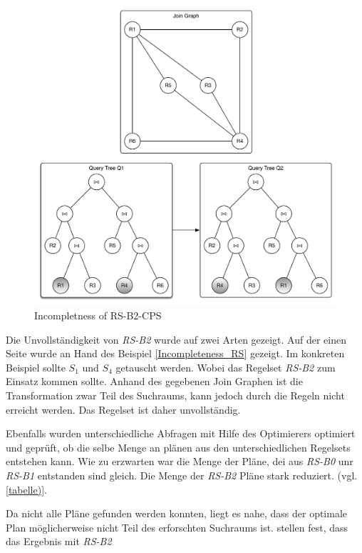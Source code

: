 \begin{figure}[h]
  \centering
  \includegraphics[width=\textwidth]{03_Related_Work/Graphs.pdf}
  \caption{Incompletness of RS-B2-CPS}
  \label{Incompleteness_RS-B2-CPS}
\end{figure}


Die Unvollständigkeit von \textit{RS-B2} wurde auf zwei Arten gezeigt. Auf der einen Seite wurde an Hand des Beispiel \ref{Incompleteness_RS} gezeigt. Im konkreten Beispiel sollte $S_1$ und $S_4$ getauscht werden. Wobei das Regelset \textit{RS-B2} zum Einsatz kommen sollte. Anhand des gegebenen Join Graphen ist die Transformation zwar Teil des Suchraums, kann jedoch durch die Regeln nicht erreicht werden. Das Regelset ist daher unvollständig.

Ebenfalls wurden unterschiedliche Abfragen mit Hilfe des Optimierers optimiert und geprüft, ob die selbe Menge an plänen aus den unterschiedlichen Regelsets entstehen kann. Wie zu erzwarten war die Menge der Pläne, dei aus \textit{RS-B0} unr \textit{RS-B1} entstanden sind gleich. Die Menge der \textit{RS-B2} Pläne stark reduziert. (vgl. \ref{tabelle)}.

Da nicht alle Pläne gefunden werden konnten, liegt es nahe, dass der optimale Plan möglicherweise nicht Teil des erforschten Suchraums ist. \cite{shanbhag2014optimizing} stellen fest, dass das Ergebnis mit \textit{RS-B2} 





